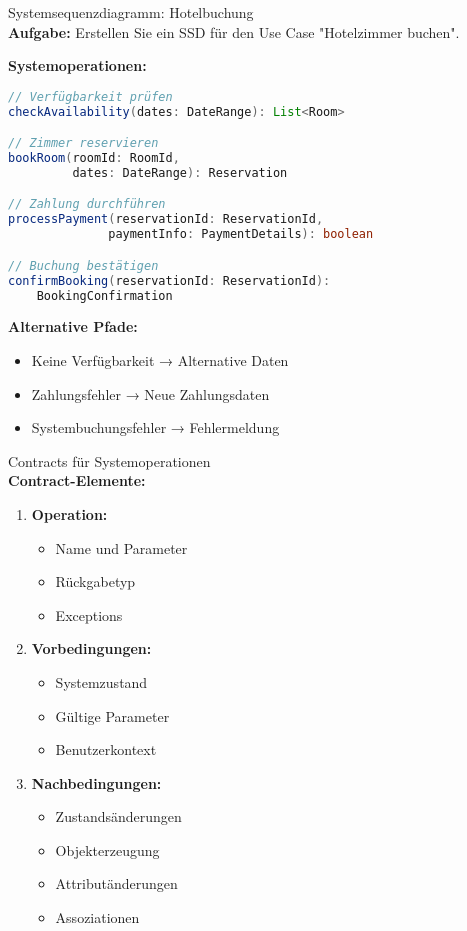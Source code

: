\begin{example2}{Systemsequenzdiagramm: Hotelbuchung}\\
\textbf{Aufgabe:} Erstellen Sie ein SSD für den Use Case "Hotelzimmer buchen".

\textbf{Systemoperationen:}
\begin{lstlisting}[language=Java, style=base]
// Verfügbarkeit prüfen
checkAvailability(dates: DateRange): List<Room>

// Zimmer reservieren
bookRoom(roomId: RoomId, 
         dates: DateRange): Reservation

// Zahlung durchführen
processPayment(reservationId: ReservationId,
              paymentInfo: PaymentDetails): boolean

// Buchung bestätigen
confirmBooking(reservationId: ReservationId): 
    BookingConfirmation
\end{lstlisting}

\textbf{Alternative Pfade:}
\begin{itemize}
    \item Keine Verfügbarkeit → Alternative Daten
    \item Zahlungsfehler → Neue Zahlungsdaten
    \item Systembuchungsfehler → Fehlermeldung
\end{itemize}
\end{example2}

\begin{KR}{Contracts für Systemoperationen}\\
\textbf{Contract-Elemente:}
\begin{enumerate}
    \item \textbf{Operation:}
    \begin{itemize}
        \item Name und Parameter
        \item Rückgabetyp
        \item Exceptions
    \end{itemize}
    
    \item \textbf{Vorbedingungen:}
    \begin{itemize}
        \item Systemzustand
        \item Gültige Parameter
        \item Benutzerkontext
    \end{itemize}
    
    \item \textbf{Nachbedingungen:}
    \begin{itemize}
        \item Zustandsänderungen
        \item Objekterzeugung
        \item Attributänderungen
        \item Assoziationen
    \end{itemize}
\end{enumerate}
\end{KR}

